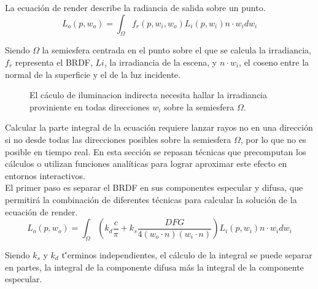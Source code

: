 
    La ecuaci\'on de render describe la radiancia de salida sobre un punto.
    \begin{equation}
    L_o(p, w_o) = \int_{\Omega} f_r(p, w_i, w_o)L_i(p, w_i)n\cdot{w_i}dw_i
    \end{equation}
    \singlespacing
    
    Siendo $\Omega$ la semiesfera centrada en el punto sobre el que se calcula la irradiancia, $f_r$ representa el BRDF, $Li$,
    la irradiancia de la escena, y $n\cdot{w_i}$, el coseno entre la normal de la superficie y el de la luz incidente.
    
    \begin{figure}[H]
        \vspace{0.5cm}
        \centering
        \caption{El c\'aculo de iluminacion indirecta necesita hallar la irradiancia proviniente en todas direcciones $w_i$ sobre la semiesfera $\Omega$.}
      \end{figure}
      \singlespacing

    Calcular la parte integral de la ecuaci\'on requiere lanzar rayos no en una direcci\'on si no desde todas las direcciones posibles
    sobre la semiesfera $\Omega$, por lo que no es posible en tiempo real. En esta secci\'on se repasan t\'ecnicas que precomputan
    los c\'alculos o utilizan funciones anal\'iticas para lograr aproximar este efecto en entornos interactivos.\\

    El primer paso es separar el BRDF en sus componentes especular y difusa, que permitir\'a la combinaci\'on de diferentes
    t\'ecnicas para calcular la soluci\'on de la ecuaci\'on de render.\\

    \begin{equation}
    L_o(p, w_o) = \int_{\Omega} (k_d \frac{c}{\pi} + 
    k_s \frac{DFG}{4(w_o\cdot{n})(w_i\cdot{n})})L_i(p, w_i)n\cdot{w_i}dw_i
    \end{equation}
    \singlespacing
    
    Siendo $k_s$ y $k_d$ t\''erminos independientes, el c\'alculo de la integral se puede separar en partes, la
    integral de la componente difusa m\'as la integral de la componente especular. 
    
